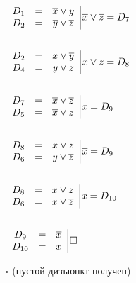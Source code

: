 \documentclass[russian]{lecture-notes}
\begin{document}
	\begin{example}
$
		 \left.
  \begin{array}{ccc}
     D_{1} & = & \overline{x} \lor y \\
     D_{2} & = & \overline{y} \lor \overline{z} \\
  \end{array}
\right. \vline \overline{x} \lor \overline{z} = D_{7}
$

		 $ $

$
		\left.
  \begin{array}{ccc}
     D_{2} & = & x \lor \overline{y} \\
     D_{4} & = & y \lor z \\
  \end{array}
\right. \vline x \lor z = D_{8}
$

		$ $

$
		\left.
  \begin{array}{ccc}
     D_{7} & = & \overline{x} \lor \overline{z} \\
     D_{5} & = & \overline{x} \lor z \\
  \end{array}
\right. \vline x = D_{9}
$

		$ $

$
		\left.
  \begin{array}{ccc}
     D_{8} & = & x \lor z \\
     D_{6} & = & y \lor \overline{z} \\
  \end{array}
\right. \vline \overline{x} = D_{9}
$

		 $ $

$
		\left.
  \begin{array}{ccc}
     D_{8} & = & x \lor z \\
     D_{6} & = & x \lor \overline{z} \\
  \end{array}
\right. \vline x = D_{10}
$

		$ $

$
		\left.
  \begin{array}{ccc}
     D_{9} & = & \overline{x} \\
     D_{10} & = & x \\
  \end{array}
\right. \vline \square
$

		$\square $ (пустой дизъюнкт получен)

		\end{example}
\end{document}
